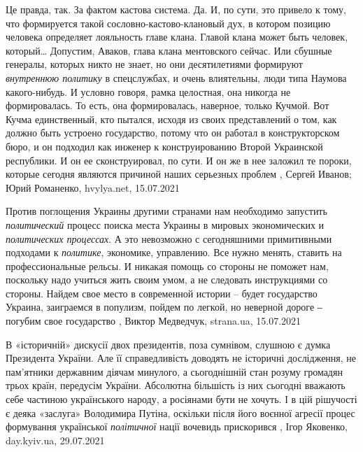 Це правда, так. За фактом кастова система.
Да. И, по сути, это привело к тому, что формируется такой
сословно-кастово-клановый дух, в котором позицию человека определяет лояльность
главе клана. Главой клана может быть человек, который… Допустим, Аваков, глава
клана ментовского сейчас. Или сбушные генералы, которых никто не знает, но они
десятилетиями формируют \emph{внутреннюю политику} в спецслужбах, и очень влиятельны,
люди типа Наумова какого-нибудь. И условно говоря, рамка целостная, она никогда
не формировалась. То есть, она формировалась, наверное, только Кучмой.
Вот Кучма единственный, кто пытался, исходя из своих представлений о том, как
должно быть устроено государство, потому что он работал в конструкторском бюро,
и он подходил как инженер к конструированию Второй Украинской республики. И он
ее сконструировал, по сути. И он же в нее заложил те пороки, которые сегодня
являются причиной наших серьезных проблем
, 
Сергей Иванов; Юрий Романенко, hvylya.net, 15.07.2021

Против поглощения Украины другими странами нам необходимо запустить
\emph{политический} процесс поиска места Украины в мировых экономических и
\emph{политических процессах}. А это невозможно с сегодняшними примитивными подходами
к \emph{политике}, экономике, управлению. Все нужно менять, ставить на
профессиональные рельсы. И никакая помощь со стороны не поможет нам, поскольку
надо учиться жить своим умом, а не следовать инструкциями со стороны. Найдем
свое место в современной истории – будет государство Украина, заиграемся в
популизм, пойдем по легкой, но неверной дороге ‒ погубим свое государство
, 
Виктор Медведчук, strana.ua, 15.07.2021

В «історичній» дискусії двох президентів, поза сумнівом, слушною є думка
Президента України. Але її справедливість доводять не історичні дослідження, не
пам’ятники державним діячам минулого, а сьогоднішній стан розуму громадян трьох
країн, передусім України. Абсолютна більшість із них сьогодні вважають себе
частиною українського народу, а росіянами бути не хочуть. І в цій рішучості є
деяка «заслуга» Володимира Путіна, оскільки після його воєнної агресії процес
формування української \emph{політичної} нації вочевидь прискорився
, 
Ігор Яковенко, day.kyiv.ua, 29.07.2021

